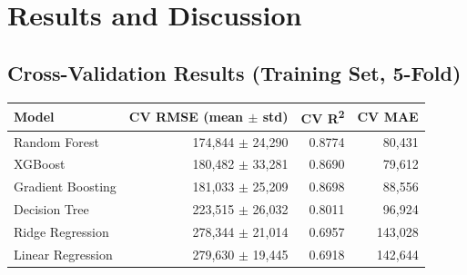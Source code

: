 \documentclass[12pt,a4paper]{report}
\let\oldtable\table
\let\endoldtable\endtable
\renewenvironment{table}[1][H]{\oldtable[#1]\singlespacing}{\endoldtable}
\begin{document}
\chapter{Results and Discussion}

\section*{Cross-Validation Results (Training Set, 5-Fold)}
\begin{table}[H]
\centering
\small
\begin{tabular}{|l|r|r|r|}
\hline
\textbf{Model} & \textbf{CV RMSE (mean $\pm$ std)} & \textbf{CV R\textsuperscript{2}} & \textbf{CV MAE} \\
\hline
Random Forest      & 174{,}844 $\pm$ 24{,}290 & 0.8774 & 80{,}431 \\
\hline
XGBoost             & 180{,}482 $\pm$ 33{,}281 & 0.8690 & 79{,}612 \\
\hline
Gradient Boosting   & 181{,}033 $\pm$ 25{,}209 & 0.8698 & 88{,}556 \\
\hline
Decision Tree       & 223{,}515 $\pm$ 26{,}032 & 0.8011 & 96{,}924 \\
\hline
Ridge Regression    & 278{,}344 $\pm$ 21{,}014 & 0.6957 & 143{,}028 \\
\hline
Linear Regression   & 279{,}630 $\pm$ 19{,}445 & 0.6918 & 142{,}644 \\
\hline
\end{tabular}
\caption{5-fold cross-validation comparison (Rs., training split only).}
\end{table}
\end{document}
